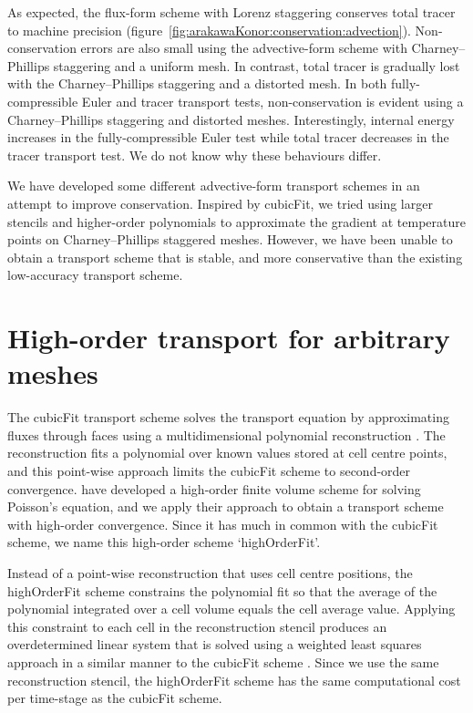 \documentclass[a4paper,11pt]{article}
\begin{document}
As expected, the flux-form scheme with Lorenz staggering conserves total tracer to machine precision (figure~\ref{fig:arakawaKonor:conservation:advection}).  Non-conservation errors are also small using the advective-form scheme with Charney--Phillips staggering and a uniform mesh.
In contrast, total tracer is gradually lost with the Charney--Phillips staggering and a distorted mesh.
In both fully-compressible Euler and tracer transport tests, non-conservation is evident using a Charney--Phillips staggering and distorted meshes.
Interestingly, internal energy increases in the fully-compressible Euler test while total tracer decreases in the tracer transport test.  We do not know why these behaviours differ.

We have developed some different advective-form transport schemes in an attempt to improve conservation.  Inspired by cubicFit, we tried using larger stencils and higher-order polynomials to approximate the gradient at temperature points on Charney--Phillips staggered meshes.  However, we have been unable to obtain a transport scheme that is stable, and more conservative than the existing low-accuracy transport scheme.

\section{High-order transport for arbitrary meshes}

The cubicFit transport scheme solves the transport equation by approximating fluxes through faces using a multidimensional polynomial reconstruction \citep{shaw2017}.
The reconstruction fits a polynomial over known values stored at cell centre points, and this point-wise approach limits the cubicFit scheme to second-order convergence.
\citet{devendran2017} have developed a high-order finite volume scheme for solving Poisson's equation, and we apply their approach to obtain a transport scheme with high-order convergence.
Since it has much in common with the cubicFit scheme, we name this high-order scheme `highOrderFit'. 

Instead of a point-wise reconstruction that uses cell centre positions, the highOrderFit scheme constrains the polynomial fit so that the average of the polynomial integrated over a cell volume equals the cell average value.
Applying this constraint to each cell in the reconstruction stencil produces an overdetermined linear system that is solved using a weighted least squares approach in a similar manner to the cubicFit scheme \citep{shaw2017}.
Since we use the same reconstruction stencil, the highOrderFit scheme has the same computational cost per time-stage as the cubicFit scheme.
\end{document}
